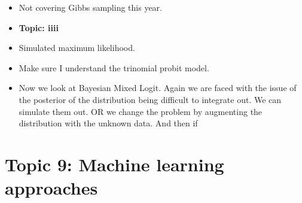 \documentclass[12pt]{article}
\begin{document}
\begin{itemize}
      \item Not covering Gibbs sampling this year.
      \item \textbf{Topic: iiii}
      \item Simulated maximum likelihood.
      \item Make sure I understand the trinomial probit model.
      \item Now we look at Bayesian Mixed Logit. Again we are faced with the issue of the posterior of the distribution
            being difficult to integrate out. We can simulate them out. OR we change the problem by augmenting the distribution
            with the unknown data. And then if

\end{itemize}

\section*{Topic 9: Machine learning approaches}
\end{document}

